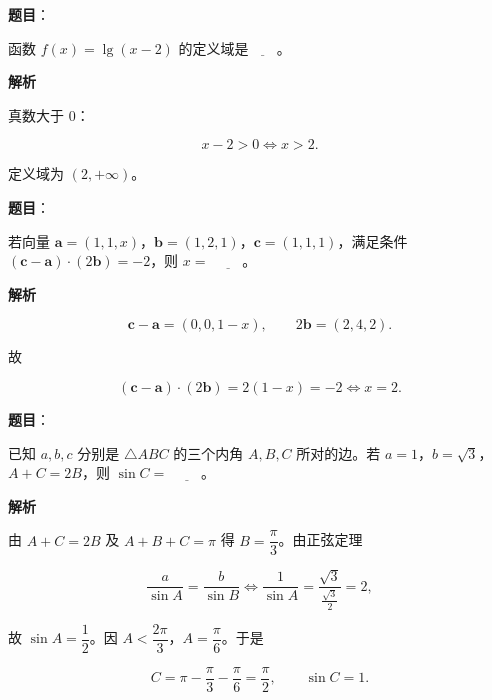 \begin{answer}

\textbf{题目}：

函数 $f(x)=\lg(x-2)$ 的定义域是$\underline{\qquad}$。

\textbf{解析}

真数大于 $0$：

\nopagebreak[4]
\[x-2>0\iff x>2.\]

定义域为 $(2,+\infty)$。


\end{answer}
\begin{answer}

\textbf{题目}：

若向量 $\boldsymbol a=(1,1,x)$，$\boldsymbol b=(1,2,1)$，$\boldsymbol c=(1,1,1)$，满足条件 $(\boldsymbol c-\boldsymbol a)\cdot(2\boldsymbol b)=-2$，则 $x=$ $\underline{\qquad}$。

\textbf{解析}

\nopagebreak[4]
\[\boldsymbol c-\boldsymbol a=(0,0,1-x),\qquad 2\boldsymbol b=(2,4,2).\]

故

\nopagebreak[4]
\[(\boldsymbol c-\boldsymbol a)\cdot(2\boldsymbol b)=2(1-x)=-2\iff x=2.\]


\end{answer}
\begin{answer}

\textbf{题目}：

已知 $a,b,c$ 分别是 $\triangle ABC$ 的三个内角 $A,B,C$ 所对的边。若 $a=1$，$b=\sqrt3$，$A+C=2B$，则 $\sin C=$ $\underline{\qquad}$。

\textbf{解析}

由 $A+C=2B$ 及 $A+B+C=\pi$ 得 $B=\dfrac\pi3$。由正弦定理

\nopagebreak[4]
\[\frac a{\sin A}=\frac b{\sin B}
\iff \frac1{\sin A}=\frac{\sqrt3}{\frac{\sqrt3}2}=2,\]

故 $\sin A=\dfrac12$。因 $A<\dfrac{2\pi}3$，$A=\dfrac\pi6$。于是

\nopagebreak[4]
\[C=\pi-\frac\pi3-\frac\pi6=\frac\pi2,\qquad \sin C=1.\]


\end{answer}
